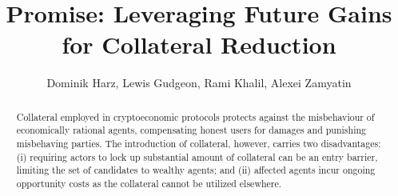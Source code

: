 \documentclass[runningheads]{llncs}
\newcommand{\sys}{Promise\xspace}
\newcommand{\dom}[1]{\todo[linecolor=green,backgroundcolor=green!25,bordercolor=green,inline,caption={}]{Comment by Dominik: #1}}
\begin{document}
\title{
\sys: Leveraging Future Gains for Collateral Reduction
} 
\author{
Dominik Harz, Lewis Gudgeon, Rami Khalil, Alexei Zamyatin
}


\date{}
\maketitle


\begin{abstract}
Collateral employed in cryptoeconomic protocols protects against the misbehaviour of economically rational agents, compensating honest users for damages and punishing misbehaving parties.
The introduction of collateral, however, carries two disadvantages: (i) requiring actors to lock up substantial amount of collateral can be an entry barrier, limiting the set of candidates to wealthy agents; and (ii) affected agents incur ongoing opportunity costs as the collateral cannot be utilized elsewhere.


\end{abstract}
\end{document}

